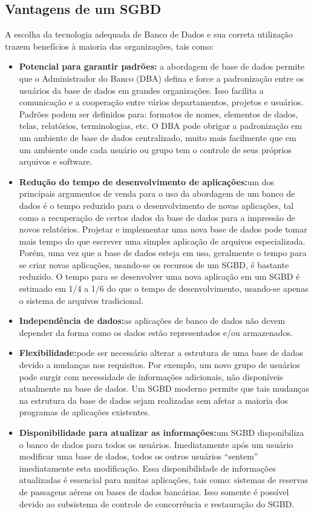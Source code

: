 \documentclass{article}
\begin{document}
\subsection*{Vantagens de um SGBD}
A escolha da tecnologia adequada de Banco de Dados e sua correta utilização trazem benefícios à maioria das organizações, tais como:

\begin{itemize}
    \item \textbf{Potencial para garantir padrões:} a abordagem de base de dados permite que o Administrador do Banco (DBA) defina e force a padronização entre os usuários da base de dados em grandes organizações. Isso facilita a comunicação e a cooperação entre vários departamentos, projetos e usuários. Padrões podem ser definidos para: formatos de nomes, elementos de dados, telas, relatórios, terminologias, etc. O DBA pode obrigar a padronização em um ambiente de base de dados centralizado, muito mais facilmente que em um ambiente onde cada usuário ou grupo tem o controle de seus próprios arquivos e software.
    \item \textbf{Redução do tempo de desenvolvimento de aplicações:}um dos principais argumentos de venda para o uso da abordagem de um banco de dados é o tempo reduzido para o desenvolvimento de novas aplicações, tal como a recuperação de certos dados da base de dados para a impressão de novos relatórios. Projetar e implementar uma nova base de dados pode tomar mais tempo do que escrever uma simples aplicação de arquivos especializada. Porém, uma vez que a base de dados esteja em uso, geralmente o tempo para se criar novas aplicações, usando-se os recursos de um SGBD, é bastante reduzido. O tempo para se desenvolver uma nova aplicação em um SGBD é estimado em 1/4 a 1/6 do que o tempo de desenvolvimento, usando-se apenas o sistema de arquivos tradicional.
    \item \textbf{Independência de dados:}as aplicações de banco de dados não devem depender da forma como os dados estão representados e/ou armazenados.
    \item \textbf{Flexibilidade:}pode ser necessário alterar a estrutura de uma base de dados devido a mudanças nos requisitos. Por exemplo, um novo grupo de usuários pode surgir com necessidade de informações adicionais, não disponíveis atualmente na base de dados. Um SGBD moderno permite que tais mudanças na estrutura da base de dados sejam realizadas sem afetar a maioria dos programas de aplicações existentes.
    \item \textbf{Disponibilidade para atualizar as informações:}um SGBD disponibiliza o banco de dados para todos os usuários. Imediatamente após um usuário modificar uma base de dados, todos os outros usuários “sentem” imediatamente esta modificação. Essa disponibilidade de informações atualizadas é essencial para muitas aplicações, tais como: sistemas de reservas de passagens aéreas ou bases de dados bancárias. Isso somente é possível devido ao subsistema de controle de concorrência e restauração do SGBD.

\end{itemize}
\end{document}
